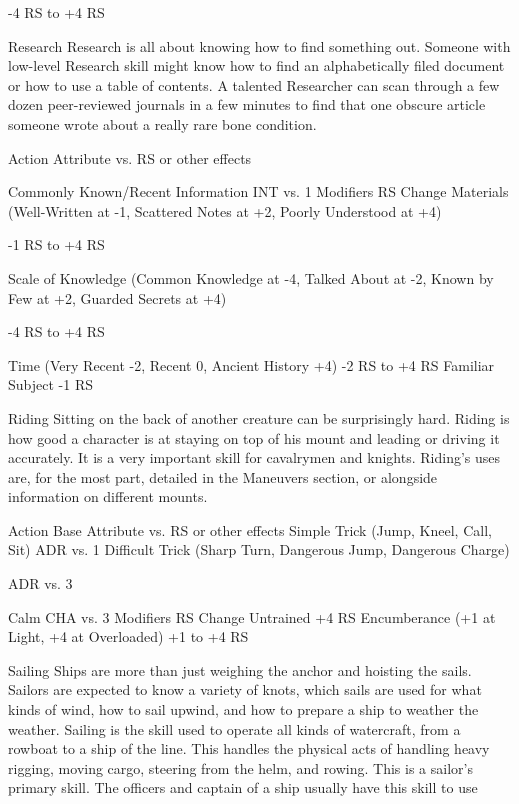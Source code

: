 \documentclass[oneside,11pt,english]{book}
\begin{document}
-4 RS to +4 RS 

 

 

 

Research 
Research is all about knowing how to find something out. Someone with low-level Research skill might 
know how to find an alphabetically filed document or how to use a table of contents. A talented 
Researcher can scan through a few dozen peer-reviewed journals in a few minutes to find that one 
obscure article someone wrote about a really rare bone condition. 

 

Action Attribute vs. RS or 
other effects 


Commonly Known/Recent Information INT vs. 1 
Modifiers RS Change 
Materials (Well-Written at -1, Scattered Notes at +2, Poorly Understood at 
+4) 

-1 RS to +4 RS 

Scale of Knowledge (Common Knowledge at -4, Talked About at -2, Known 
by Few at +2, Guarded Secrets at +4) 

-4 RS to +4 RS 

Time (Very Recent -2, Recent 0, Ancient History +4) -2 RS to +4 RS 
Familiar Subject -1 RS 

 

 

Riding 
Sitting on the back of another creature can be surprisingly hard. Riding is how good a character is at 
staying on top of his mount and leading or driving it accurately. It is a very important skill for cavalrymen 
and knights. 
Riding’s uses are, for the most part, detailed in the Maneuvers section, or alongside information on 
different mounts. 

 

Action Base Attribute vs. RS or other 
effects 
Simple Trick (Jump, Kneel, Call, Sit) ADR vs. 1 
Difficult Trick (Sharp Turn, Dangerous Jump, Dangerous 
Charge) 

ADR vs. 3 

Calm CHA vs. 3 
Modifiers RS Change 
Untrained +4 RS 
Encumberance (+1 at Light, +4 at Overloaded) +1 to +4 RS 

 

 

 

 

Sailing 
Ships are more than just weighing the anchor and hoisting the sails. Sailors are expected to know a variety 
of knots, which sails are used for what kinds of wind, how to sail upwind, and how to prepare a ship to 
weather the weather. Sailing is the skill used to operate all kinds of watercraft, from a rowboat to a ship of 
the line. This handles the physical acts of handling heavy rigging, moving cargo, steering from the helm, 
and rowing. This is a sailor’s primary skill. The officers and captain of a ship usually have this skill to use 
\end{document}
